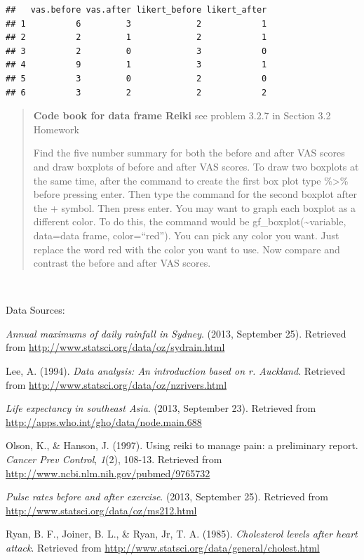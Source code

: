 \documentclass[]{book}
\begin{document}
\begin{verbatim}
##   vas.before vas.after likert_before likert_after
## 1          6         3             2            1
## 2          2         1             2            1
## 3          2         0             3            0
## 4          9         1             3            1
## 5          3         0             2            0
## 6          3         2             2            2
\end{verbatim}

\begin{quote}
\textbf{Code book for data frame Reiki} see problem 3.2.7 in Section 3.2 Homework

Find the five number summary for both the before and after VAS scores and draw boxplots of before and after VAS scores. To draw two boxplots at the same time, after the command to create the first box plot type \%\textgreater{}\% before pressing enter. Then type the command for the second boxplot after the + symbol. Then press enter. You may want to graph each boxplot as a different color. To do this, the command would be gf\_boxplot(\textasciitilde{}variable, data=data frame, color=``red''). You can pick any color you want. Just replace the word red with the color you want to use.
Now compare and contrast the before and after VAS scores.
\end{quote}

\textbf{\\
}

Data Sources:

\emph{Annual maximums of daily rainfall in Sydney}. (2013, September 25).
Retrieved from \url{http://www.statsci.org/data/oz/sydrain.html}

Lee, A. (1994). \emph{Data analysis: An introduction based on r. Auckland}.
Retrieved from \url{http://www.statsci.org/data/oz/nzrivers.html}

\emph{Life expectancy in southeast Asia}. (2013, September 23). Retrieved
from \url{http://apps.who.int/gho/data/node.main.688}

Olson, K., \& Hanson, J. (1997). Using reiki to manage pain: a
preliminary report. \emph{Cancer Prev Control}, \emph{1}(2), 108-13. Retrieved
from \url{http://www.ncbi.nlm.nih.gov/pubmed/9765732}

\emph{Pulse rates before and after exercise}. (2013, September 25). Retrieved
from \url{http://www.statsci.org/data/oz/ms212.html}

Ryan, B. F., Joiner, B. L., \& Ryan, Jr, T. A. (1985). \emph{Cholesterol
levels after heart attack}. Retrieved from
\url{http://www.statsci.org/data/general/cholest.html}
\end{document}
